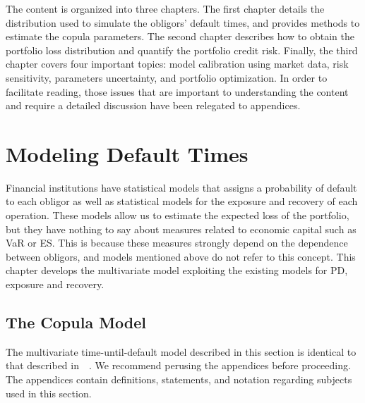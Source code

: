 \documentclass[11pt,fleqn]{book} %
\begin{document}
The content is organized into three chapters. The first chapter details the 
distribution used to simulate the obligors' default times, and provides methods 
to estimate the copula parameters. The second chapter describes how to obtain 
the portfolio loss distribution and quantify the portfolio credit risk.
Finally, the third chapter covers four important topics: model calibration using
market data, risk sensitivity, parameters uncertainty, and portfolio optimization. 
In order to facilitate reading, those issues that are important to understanding 
the content and require a detailed discussion have been relegated to appendices.


\chapter{Modeling Default Times}
\label{chap:mdt}

Financial institutions have statistical models that assigns a probability of 
default to each obligor as well as statistical models for the exposure and 
recovery of each operation. These models allow us to estimate the expected 
loss of the portfolio, but they have nothing to say about measures related 
to economic capital such as VaR or ES. This is because these measures strongly 
depend on the dependence between obligors, and models mentioned above do not 
refer to this concept. This chapter develops the multivariate model exploiting 
the existing models for PD, exposure and recovery.

\section{The Copula Model}

The multivariate time-until-default model described in this section is identical
to that described in~\cite{li:2000,frey:2001}~\cite[chap. 2.6]{bluhm:2002}.
We recommend perusing the appendices before proceeding. The appendices contain 
definitions, statements, and notation regarding subjects used in this section.
\end{document}
